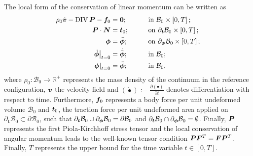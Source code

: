 The local form of the conservation of linear momentum \cite{Gonzalez_book} can be written as
%
\begin{equation}\label{eqn:local form conservation of linear momentum}
\begin{aligned}
  \rho_0\dot{\boldsymbol{v}} - \operatorname{DIV}\boldsymbol{P} - \boldsymbol{f}_0& = \boldsymbol{0};&\qquad &\text{in}\,\,\mathcal{B}_0\times \left[0,T\right];\\
  \boldsymbol{P}\cdot\boldsymbol{N}& = \boldsymbol{t}_0;&\qquad&\text{on}\,\,\partial_{\boldsymbol{t}}\mathcal{B}_0\times \left[0,T\right];\\
  \boldsymbol{\phi} &= \bar{\boldsymbol{\phi}};&\qquad & \text{on}\,\,\partial_{\boldsymbol{\phi}}\mathcal{B}_0\times \left[0,T\right];\\
  \left.\dot{\boldsymbol{\phi}}\right|_{t=0}&=\dot{\bar{\boldsymbol{\phi}}};&\qquad &\text{in}\,\,\mathcal{B}_0;\\
  \left.\boldsymbol{\phi}\right|_{t=0}&=\bar{\boldsymbol{\phi}};&\qquad
  &\text{in}\,\,\mathcal{B}_0,
\end{aligned}
\end{equation}
%
where $\rho_0: \mathcal{B}_0\rightarrow \mathbb{R}^{+}$ represents the mass density of the continuum in the reference configuration, $\boldsymbol{v}$ the velocity field and 
 $\left(\dot{\bullet}\right):=\frac{\partial (\bullet)}{\partial t}$ denotes differentiation with respect to time. 
Furthermore, $\boldsymbol{f}_0$ represents a body force per unit undeformed volume $\mathcal{B}_0$ and $\boldsymbol{t}_0$, the traction force per unit undeformed area applied on $\partial_{\boldsymbol{t}}\mathcal{B}_0\subset \partial \mathcal{B}_0$, such that $\partial_{\boldsymbol{t}}\mathcal{B}_0 \cup \partial_{\boldsymbol{\phi}}\mathcal{B}_0 = \partial\mathcal{B}_0$ and $\partial_{\boldsymbol{t}}\mathcal{B}_0 \cap \partial_{\boldsymbol{\phi}}\mathcal{B}_0 = \emptyset$. 
Finally,  $\boldsymbol{P}$ %
represents the first Piola-Kirchhoff stress tensor and the local conservation of angular momentum leads to the well-known tensor condition $\boldsymbol{PF}^T = \boldsymbol{FP}^T$. Finally, $T$ represents the upper bound for the time variable $t\in\left[0,T\right]$.
%


